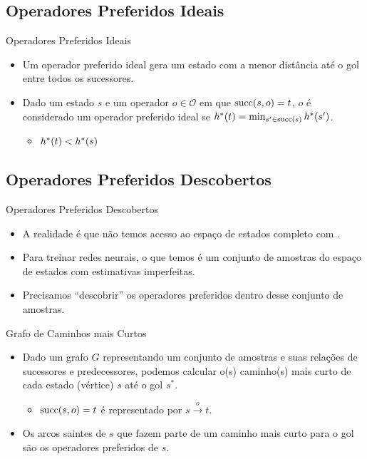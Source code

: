 \documentclass{beamer}
\begin{document}
\subsection{Operadores Preferidos Ideais}
\begin{frame}{Operadores Preferidos Ideais}
\begin{itemize}
  \item Um operador preferido ideal gera um estado com a \alert{menor distância até o gol} entre todos os sucessores.
  \pause
  \item Dado um estado $s$ e um operador $o \in \mathcal{O}$ em que $\operatorname{succ}(s,o) = t$, $o$ é considerado um operador preferido ideal se $h^*({t}) = \min_{s' \in \operatorname{succ}(s)} h^*({s'})$.
  \begin{itemize}
    \item $h^*({t}) < h^*({s})$
  \end{itemize}
\end{itemize}
\end{frame}

\subsection{Operadores Preferidos Descobertos}
\begin{frame}{Operadores Preferidos Descobertos}
\begin{itemize}
  \item A realidade é que \alert{não temos acesso ao espaço de estados completo} com \hstar.
  \pause
  \item Para treinar redes neurais, o que temos é um \alert{conjunto de amostras} do espaço de estados com \alert{estimativas imperfeitas}.
  \pause
  \item Precisamos ``descobrir'' os operadores preferidos dentro desse conjunto de amostras.
\end{itemize}
\end{frame}

\begin{frame}{Grafo de Caminhos mais Curtos}
\begin{itemize}
  \item Dado um grafo $G$ representando um \alert{conjunto de amostras} e suas relações de sucessores e predecessores, podemos calcular o(s) \alert{caminho(s) mais curto de cada estado} (vértice) $s$ até o gol $s^{*}$.
  \begin{itemize}
    \item $\operatorname{succ}(s, o) = t$ é representado por $s \xrightarrow{o} t$.
  \end{itemize}
  \pause
  \item Os \alert{arcos saintes} de $s$ que \alert{fazem parte de um caminho mais curto} para o gol são os \alert{operadores preferidos} de $s$.
\end{itemize}
\end{frame}
\end{document}
